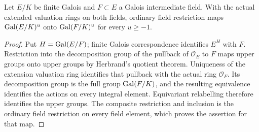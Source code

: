 \begin{lemma}
\label{fw:ordinary-upper-restriction}
\leanok
Let $E/K$ be finite Galois and $F\subset E$ a Galois intermediate field.
With the actual extended valuation rings on both fields, ordinary field
restriction maps $\operatorname{Gal}(E/K)^u$ onto $\operatorname{Gal}(F/K)^u$ for every $u\geq-1$.
\end{lemma}
\begin{proof}
Put $H=\operatorname{Gal}(E/F)$; finite Galois correspondence identifies $E^H$ with
$F$. Restriction into the decomposition group of the pullback of
$\mathcal O_E$ to $F$ maps upper groups onto upper groups by Herbrand's
quotient theorem. Uniqueness of the extension valuation ring identifies
that pullback with the actual ring $\mathcal O_F$. Its decomposition
group is the full group $\operatorname{Gal}(F/K)$, and the resulting equivalence
identifies the actions on every integral element. Equivariant relabelling
therefore identifies the upper groups. The composite restriction and
inclusion is the ordinary field restriction on every field element,
which proves the assertion for that map.
\end{proof}

